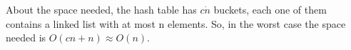 \documentclass[11pt]{537homework}
\begin{document}
\par About the space needed, the hash table has $c \dot n$ buckets, each one of them contains a linked list with at most n elements. So, in the worst case the space needed is $O(cn + n) \approx O(n)$.
\end{document}
